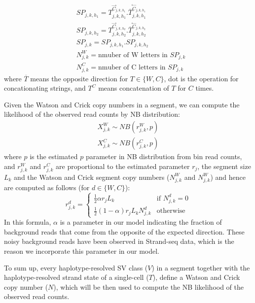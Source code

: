 \documentclass[12pt]{article}
\renewcommand{\j}{j} %
\newcommand{\CN}{C} %
\newcommand{\X}{X} %
\renewcommand{\k}{k} %
\newcommand{\h}{h} %
\newcommand{\T}{T} %
\newcommand{\V}{V} %
\newcommand{\N}{N} %
\begin{document}
\begin{align}\label{strand-pattern}
	&SP_{\j,\k,\h_1} = {\T^{\stackrel{\rightarrow}\CN_{\j,\k,\h_1}}_{\j, \k, \h_1}}.
				  {\overline{\T}^{\stackrel{\leftarrow}\CN_{\j,\k,\h_1}}_{\j, \k,\h_1}}\\
	&SP_{\j,\k,\h_2} = \T^{\stackrel{\rightarrow}\CN_{\j,\k,\h_2}}_{\j, \k, \h_2}.
				  {\overline{\T}^{\stackrel{\leftarrow}\CN_{\j,\k,\h_2}}_{\j, \k,\h_2}}\nonumber\\
	&SP_{\j,\k} = SP_{\j, \k, \h_1}.SP_{\j, \k, \h_2}\nonumber\\
	&\N_{\j, \k}^W = \text{nmuber of W letters in } SP_{\j,\k}\nonumber\\
	&\N_{\j, \k}^C = \text{nmuber of C letters in } SP_{\j,\k}\nonumber
\end{align}
where $\overline{\T}$ means the opposite direction for $\T \in \{W, C\}$, dot is the operation for concationating strings, and $\T^C$ means concatenation of $\T$ for $C$ times.

Given the Watson and Crick copy numbers in a segment, we can compute the likelihood of the observed read counts by NB distribution:
\begin{align}
	\X_{\j,\k}^W \sim NB(r_{\j,\k}^W, p)\nonumber\\
	\X_{\j,\k}^C \sim NB(r_{\j,\k}^C, p)\nonumber
\end{align}
where $p$ is the estimated $p$ parameter in NB distribution from bin read counts, and $r_{\j,\k}^W$ and $r_{\j,\k}^C$ are proportional to the estimated parameter $r_\j$, the segment size $L_\k$ and the Watson and Crick segment copy numbers ($\N_{\j, \k}^W$ and $\N_{\j, \k}^W$) and hence are computed as follows (for $d \in \{W,C\}$):
\[
r_{\j,\k}^d = 
\begin{cases}
\frac{1}{2}\alpha r_\j L_\k &\text{if } \N_{\j, \k}^d = 0 \\ 
\frac{1}{2}(1- \alpha) r_\j L_\k \N_{\j, \k}^d &\text{otherwise}
\end{cases}
\]
In this formula, $\alpha$ is a parameter in our model indicating the fraction of background reads that come from the opposite of the expected direction. These noisy background reads have been observed in Strand-seq data, which is the reason we incorporate this parameter in our model.

To sum up, every haplotype-resolved SV class ($\V$) in a segment together with the haplotype-resolved strand state of a single-cell ($\T$), define a Watson and Crick copy number ($\N$), which will be then used to compute the NB likelihood of the observed read counts.
\end{document}
